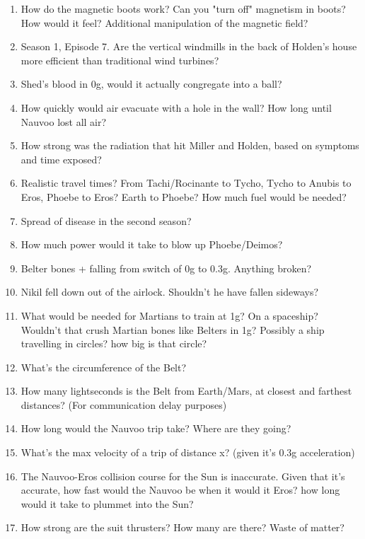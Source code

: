 \documentclass{amsart}
\theoremstyle{definition}
\begin{document}
\begin{enumerate}
    \item How do the magnetic boots work? Can you "turn off" magnetism in boots?
    \subitem How would it feel? Additional manipulation of the magnetic field?
    
    \item Season 1, Episode 7. Are the vertical windmills in the back of Holden's house more efficient than traditional wind turbines?
    
    \item Shed's blood in 0g, would it actually congregate into a ball?
    \item How quickly would air evacuate with a hole in the wall?
    \subitem How long until Nauvoo lost all air?
    \item How strong was the radiation that hit Miller and Holden, based on symptoms and time exposed?
    \item Realistic travel times? From Tachi/Rocinante to Tycho, Tycho to Anubis to Eros, Phoebe to Eros? Earth to Phoebe?
    \subitem How much fuel would be needed?
    \item Spread of disease in the second season?
    \item How much power would it take to blow up Phoebe/Deimos?
    \item Belter bones + falling from switch of 0g to 0.3g. Anything broken?
    \item Nikil fell down out of the airlock. Shouldn't he have fallen sideways?
    \item What would be needed for Martians to train at 1g? On a spaceship? Wouldn't that crush Martian bones like Belters in 1g?
    \subitem Possibly a ship travelling in circles? how big is that circle?
    \item What's the circumference of the Belt?
    \item How many lightseconds is the Belt from Earth/Mars, at closest and farthest distances? (For communication delay purposes)
    \item How long would the Nauvoo trip take? Where are they going?
    \item What's the max velocity of a trip of distance x? (given it's 0.3g acceleration)
    \item The Nauvoo-Eros collision course for the Sun is inaccurate.
    \subitem Given that it's accurate, how fast would the Nauvoo be when it would it Eros?
    \subitem how long would it take to plummet into the Sun?
    \item How strong are the suit thrusters? How many are there? Waste of matter?

\end{enumerate}
\end{document}
